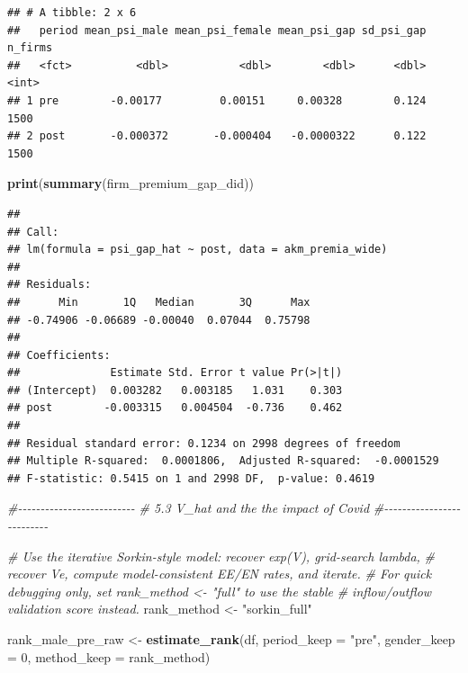 \documentclass[
]{article}
\newenvironment{Shaded}{\begin{snugshade}}{\end{snugshade}}
\newcommand{\AttributeTok}[1]{\textcolor[rgb]{0.13,0.29,0.53}{#1}}
\newcommand{\CommentTok}[1]{\textcolor[rgb]{0.56,0.35,0.01}{\textit{#1}}}
\newcommand{\DecValTok}[1]{\textcolor[rgb]{0.00,0.00,0.81}{#1}}
\newcommand{\FunctionTok}[1]{\textcolor[rgb]{0.13,0.29,0.53}{\textbf{#1}}}
\newcommand{\NormalTok}[1]{#1}
\newcommand{\OtherTok}[1]{\textcolor[rgb]{0.56,0.35,0.01}{#1}}
\newcommand{\StringTok}[1]{\textcolor[rgb]{0.31,0.60,0.02}{#1}}
\begin{document}
\begin{verbatim}
## # A tibble: 2 x 6
##   period mean_psi_male mean_psi_female mean_psi_gap sd_psi_gap n_firms
##   <fct>          <dbl>           <dbl>        <dbl>      <dbl>   <int>
## 1 pre        -0.00177         0.00151     0.00328        0.124    1500
## 2 post       -0.000372       -0.000404   -0.0000322      0.122    1500
\end{verbatim}

\begin{Shaded}
\begin{Highlighting}[]
\FunctionTok{print}\NormalTok{(}\FunctionTok{summary}\NormalTok{(firm\_premium\_gap\_did))}
\end{Highlighting}
\end{Shaded}

\begin{verbatim}
## 
## Call:
## lm(formula = psi_gap_hat ~ post, data = akm_premia_wide)
## 
## Residuals:
##      Min       1Q   Median       3Q      Max 
## -0.74906 -0.06689 -0.00040  0.07044  0.75798 
## 
## Coefficients:
##              Estimate Std. Error t value Pr(>|t|)
## (Intercept)  0.003282   0.003185   1.031    0.303
## post        -0.003315   0.004504  -0.736    0.462
## 
## Residual standard error: 0.1234 on 2998 degrees of freedom
## Multiple R-squared:  0.0001806,  Adjusted R-squared:  -0.0001529 
## F-statistic: 0.5415 on 1 and 2998 DF,  p-value: 0.4619
\end{verbatim}

\begin{Shaded}
\begin{Highlighting}[]
\CommentTok{\#{-}{-}{-}{-}{-}{-}{-}{-}{-}{-}{-}{-}{-}{-}{-}{-}{-}{-}{-}{-}{-}{-}{-}{-}{-}{-}}
\CommentTok{\# 5.3 V\_hat and the the impact of Covid}
\CommentTok{\#{-}{-}{-}{-}{-}{-}{-}{-}{-}{-}{-}{-}{-}{-}{-}{-}{-}{-}{-}{-}{-}{-}{-}{-}{-}{-}}

\CommentTok{\# Use the iterative Sorkin{-}style model: recover exp(V), grid{-}search lambda,}
\CommentTok{\# recover Ve, compute model{-}consistent EE/EN rates, and iterate.}
\CommentTok{\# For quick debugging only, set rank\_method \textless{}{-} "full" to use the stable}
\CommentTok{\# inflow/outflow validation score instead.}
\NormalTok{rank\_method }\OtherTok{\textless{}{-}} \StringTok{"sorkin\_full"}

\NormalTok{rank\_male\_pre\_raw }\OtherTok{\textless{}{-}} \FunctionTok{estimate\_rank}\NormalTok{(df, }\AttributeTok{period\_keep =} \StringTok{"pre"}\NormalTok{, }\AttributeTok{gender\_keep =} \DecValTok{0}\NormalTok{, }\AttributeTok{method\_keep =}\NormalTok{ rank\_method)}
\end{Highlighting}
\end{Shaded}
\end{document}
